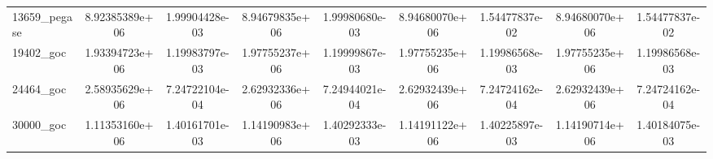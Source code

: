 \begin{tabular}{|l|cc|cc|cc|cc|}
13659\_pegase 
& 8.92385389e+06
& 1.99904428e-03
& 8.94679835e+06
& 1.99980680e-03
& 8.94680070e+06
& 1.54477837e-02
& 8.94680070e+06
& 1.54477837e-02
\\

19402\_goc 
& 1.93394723e+06
& 1.19983797e-03
& 1.97755237e+06
& 1.19999867e-03
& 1.97755235e+06
& 1.19986568e-03
& 1.97755235e+06
& 1.19986568e-03
\\

24464\_goc 
& 2.58935629e+06
& 7.24722104e-04
& 2.62932336e+06
& 7.24944021e-04
& 2.62932439e+06
& 7.24724162e-04
& 2.62932439e+06
& 7.24724162e-04
\\

30000\_goc 
& 1.11353160e+06
& 1.40161701e-03
& 1.14190983e+06
& 1.40292333e-03
& 1.14191122e+06
& 1.40225897e-03
& 1.14190714e+06
& 1.40184075e-03

  \\
  \hline
\end{tabular}